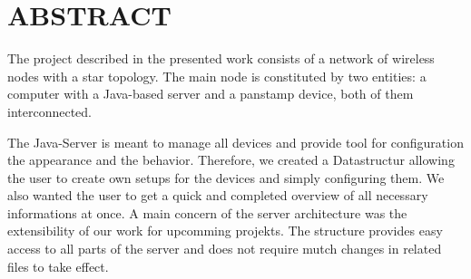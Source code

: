 \section{ABSTRACT}
The project described in the presented work consists of a network of wireless nodes with a star topology. The main node is constituted by two entities: a computer with a Java-based server and a panstamp device, both of them interconnected. 

The Java-Server is meant to manage all devices and provide tool for configuration the appearance and the behavior. Therefore, we created a Datastructur allowing the user to create own setups for the devices and simply configuring them. We also wanted the user to get a quick and completed overview of all necessary informations at once.
A main concern of the server architecture was the extensibility of our work for upcomming projekts. The structure provides easy access to all parts of the server and does not require mutch changes in related files to take effect.
